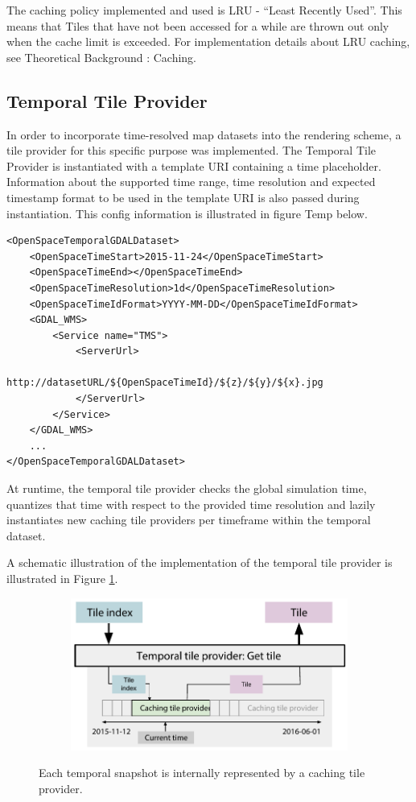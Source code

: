 The caching policy implemented and used is LRU - ``Least Recently Used''. This means that Tiles that have not been accessed for a while are thrown out only when the cache limit is exceeded. For implementation details about LRU caching, see Theoretical Background : Caching. 

\subsection{Temporal Tile Provider}
In order to incorporate time-resolved map datasets into the rendering scheme, a tile provider for this specific purpose was implemented. The Temporal Tile Provider is instantiated with a template URI containing a time placeholder. Information about the supported time range, time resolution and expected timestamp format to be used in the template URI is also passed during instantiation. This config information is illustrated in figure Temp below. 

\begin{verbatim}
<OpenSpaceTemporalGDALDataset>
    <OpenSpaceTimeStart>2015-11-24</OpenSpaceTimeStart>
    <OpenSpaceTimeEnd></OpenSpaceTimeEnd>
    <OpenSpaceTimeResolution>1d</OpenSpaceTimeResolution>
    <OpenSpaceTimeIdFormat>YYYY-MM-DD</OpenSpaceTimeIdFormat>
    <GDAL_WMS>
        <Service name="TMS">
            <ServerUrl>
                http://datasetURL/${OpenSpaceTimeId}/${z}/${y}/${x}.jpg 
            </ServerUrl>
        </Service>
    </GDAL_WMS>
    ...
</OpenSpaceTemporalGDALDataset>
\end{verbatim}

At runtime, the temporal tile provider checks the global simulation time, quantizes that time with respect to the provided time resolution and lazily instantiates new caching tile providers per timeframe within the temporal dataset. 

A schematic illustration of the implementation of the temporal tile provider is illustrated in Figure \ref{fig:temporaltileprovider_gettile}.

\begin{figure}[htbp]
    \centering
    \begin{subfigure}[bt]{0.8\textwidth}
        \includegraphics[width=\textwidth]{figures/implementation/tileprovider/temporaltileprovider_gettile.pdf}
    \end{subfigure}
    \caption{Each temporal snapshot is internally represented by a caching tile provider.}
    \label{fig:temporaltileprovider_gettile}
\end{figure}


